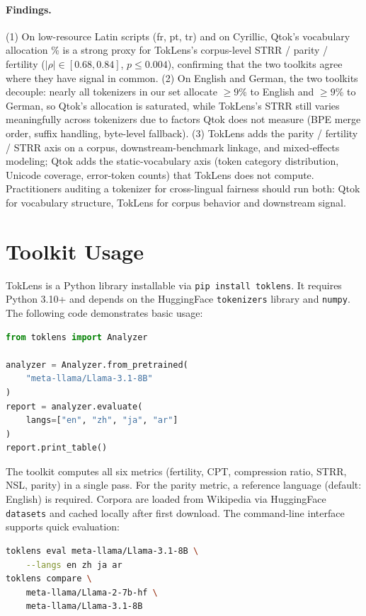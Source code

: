 \documentclass[11pt]{article}
\begin{document}
\paragraph{Findings.} (1) On low-resource Latin scripts (fr, pt, tr) and on Cyrillic, Qtok's vocabulary allocation \% is a strong proxy for TokLens's corpus-level STRR / parity / fertility ($|\rho| \in [0.68, 0.84]$, $p \leq 0.004$), confirming that the two toolkits agree where they have signal in common. (2) On English and German, the two toolkits decouple: nearly all tokenizers in our set allocate $\geq 9$\% to English and $\geq 9$\% to German, so Qtok's allocation is saturated, while TokLens's STRR still varies meaningfully across tokenizers due to factors Qtok does not measure (BPE merge order, suffix handling, byte-level fallback). (3) TokLens adds the parity / fertility / STRR axis on a corpus, downstream-benchmark linkage, and mixed-effects modeling; Qtok adds the static-vocabulary axis (token category distribution, Unicode coverage, error-token counts) that TokLens does not compute. Practitioners auditing a tokenizer for cross-lingual fairness should run both: Qtok for vocabulary structure, TokLens for corpus behavior and downstream signal.

\section{Toolkit Usage}
\label{app:toolkit}

TokLens is a Python library installable via \texttt{pip install toklens}. It requires Python 3.10+ and depends on the HuggingFace \texttt{tokenizers} library and \texttt{numpy}. The following code demonstrates basic usage:

\begin{lstlisting}[style=toklens, language=Python]
from toklens import Analyzer

analyzer = Analyzer.from_pretrained(
    "meta-llama/Llama-3.1-8B"
)
report = analyzer.evaluate(
    langs=["en", "zh", "ja", "ar"]
)
report.print_table()
\end{lstlisting}

The toolkit computes all six metrics (fertility, CPT, compression ratio, STRR, NSL, parity) in a single pass. For the parity metric, a reference language (default: English) is required. Corpora are loaded from Wikipedia via HuggingFace \texttt{datasets} and cached locally after first download. The command-line interface supports quick evaluation:

\begin{lstlisting}[style=toklens, language=bash]
toklens eval meta-llama/Llama-3.1-8B \
    --langs en zh ja ar
toklens compare \
    meta-llama/Llama-2-7b-hf \
    meta-llama/Llama-3.1-8B
\end{lstlisting}
\end{document}
